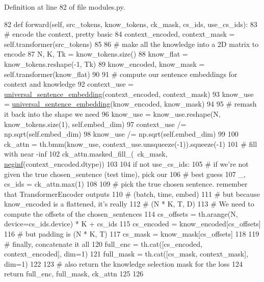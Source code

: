 Definition at line 82 of file modules.\+py.


\begin{DoxyCode}
82     \textcolor{keyword}{def }forward(self, src\_tokens, know\_tokens, ck\_mask, cs\_ids, use\_cs\_ids):
83         \textcolor{comment}{# encode the context, pretty basic}
84         context\_encoded, context\_mask = self.transformer(src\_tokens)
85 
86         \textcolor{comment}{# make all the knowledge into a 2D matrix to encode}
87         N, K, Tk = know\_tokens.size()
88         know\_flat = know\_tokens.reshape(-1, Tk)
89         know\_encoded, know\_mask = self.transformer(know\_flat)
90 
91         \textcolor{comment}{# compute our sentence embeddings for context and knowledge}
92         context\_use = \hyperlink{namespaceprojects_1_1wizard__of__wikipedia_1_1generator_1_1modules_aa0e28a2592caa75f5c687c6200d2a68d}{universal\_sentence\_embedding}(context\_encoded, 
      context\_mask)
93         know\_use = \hyperlink{namespaceprojects_1_1wizard__of__wikipedia_1_1generator_1_1modules_aa0e28a2592caa75f5c687c6200d2a68d}{universal\_sentence\_embedding}(know\_encoded, know\_mask)
94 
95         \textcolor{comment}{# remash it back into the shape we need}
96         know\_use = know\_use.reshape(N, know\_tokens.size(1), self.embed\_dim)
97         context\_use /= np.sqrt(self.embed\_dim)
98         know\_use /= np.sqrt(self.embed\_dim)
99 
100         ck\_attn = th.bmm(know\_use, context\_use.unsqueeze(-1)).squeeze(-1)
101         \textcolor{comment}{# fill with near -inf}
102         ck\_attn.masked\_fill\_(~ck\_mask, \hyperlink{namespaceparlai_1_1utils_1_1torch_a6c6e25115353dba479cd72dc31dc76ae}{neginf}(context\_encoded.dtype))
103 
104         \textcolor{keywordflow}{if} \textcolor{keywordflow}{not} use\_cs\_ids:
105             \textcolor{comment}{# if we're not given the true chosen\_sentence (test time), pick our}
106             \textcolor{comment}{# best guess}
107             \_, cs\_ids = ck\_attn.max(1)
108 
109         \textcolor{comment}{# pick the true chosen sentence. remember that TransformerEncoder outputs}
110         \textcolor{comment}{#   (batch, time, embed)}
111         \textcolor{comment}{# but because know\_encoded is a flattened, it's really}
112         \textcolor{comment}{#   (N * K, T, D)}
113         \textcolor{comment}{# We need to compute the offsets of the chosen\_sentences}
114         cs\_offsets = th.arange(N, device=cs\_ids.device) * K + cs\_ids
115         cs\_encoded = know\_encoded[cs\_offsets]
116         \textcolor{comment}{# but padding is (N * K, T)}
117         cs\_mask = know\_mask[cs\_offsets]
118 
119         \textcolor{comment}{# finally, concatenate it all}
120         full\_enc = th.cat([cs\_encoded, context\_encoded], dim=1)
121         full\_mask = th.cat([cs\_mask, context\_mask], dim=1)
122 
123         \textcolor{comment}{# also return the knowledge selection mask for the loss}
124         \textcolor{keywordflow}{return} full\_enc, full\_mask, ck\_attn
125 
126 
\end{DoxyCode}


